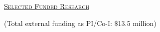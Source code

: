\documentclass[10pt]{report}
\begin{document}
%
%
%
\vspace*{.1in}
\textsc{\underline{Selected Funded Research}}

{\small (Total external funding as PI/Co-I: \$13.5 million)}
\end{document}
